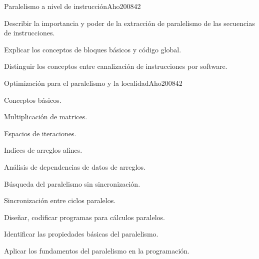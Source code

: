 \begin{syllabus}
\begin{unit}{Paralelismo a nivel de instrucción}{Aho2008}{4}{2}
  \begin{unitgoals}
     \item Describir la importancia y poder de la extracción de paralelismo de las secuencias de instrucciones.
     \item Explicar los conceptos de bloques básicos y código global.
     \item Distinguir los conceptos entre canalización de instrucciones por software.
  \end{unitgoals}
\end{unit}

\begin{unit}{Optimización para el paralelismo y la localidad}{Aho2008}{4}{2}
  \begin{topics}
     \item Conceptos básicos.
     \item Multiplicación de matrices.
     \item Espacios de iteraciones.
     \item Indices de arreglos afines.
     \item Análisis de dependencias de datos de arreglos.
     \item Búsqueda del paralelismo sin sincronización.
     \item Sincronización entre ciclos paralelos.
  \end{topics}

  \begin{unitgoals}
     \item Diseñar, codificar programas para cálculos paralelos.
     \item Identificar las propiedades básicas del paralelismo.
     \item Aplicar los fundamentos del paralelismo en la programación.
  \end{unitgoals}
\end{unit}



\begin{coursebibliography}
\end{coursebibliography}

\end{syllabus}
